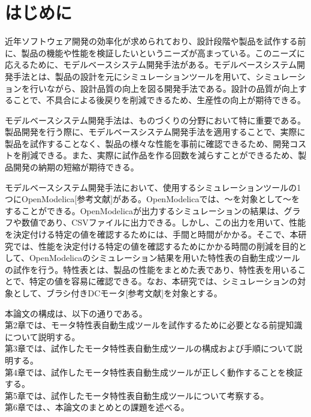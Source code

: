 \chapter{はじめに}\label{cha:Introduction}
近年ソフトウェア開発の効率化が求められており、設計段階や製品を試作する前に、製品の機能や性能を検証したいというニーズが高まっている\cite{modelica_beginners_book}。このニーズに応えるために、モデルベースシステム開発手法がある\cite{modelica_beginners_book}。モデルベースシステム開発手法とは、製品の設計を元にシミュレーションツールを用いて、シミュレーションを行いながら、設計品質の向上を図る開発手法である\cite{ipa_2016}。設計の品質が向上することで、不具合による後戻りを削減できるため、生産性の向上が期待できる\cite{ipa_2016}。

モデルベースシステム開発手法は、ものづくりの分野において特に重要である\cite{ipa_useful_modelbase_dev}。製品開発を行う際に、モデルベースシステム開発手法を適用することで、実際に製品を試作することなく、製品の様々な性能を事前に確認できるため、開発コストを削減できる\cite{modelica_beginners_book}。また、実際に試作品を作る回数を減らすことができるため、製品開発の納期の短縮が期待できる。

モデルベースシステム開発手法において、使用するシミュレーションツールの1つにOpenModelica[参考文献]がある。OpenModelicaでは、～を対象として～をすることができる。OpenModelicaが出力するシミュレーションの結果は、グラフや数値であり、CSVファイルに出力できる。しかし、この出力を用いて、性能を決定付ける特定の値を確認するためには、手間と時間がかかる。そこで、本研究では、性能を決定付ける特定の値を確認するためにかかる時間の削減を目的として、OpenModelicaのシミュレーション結果を用いた特性表の自動生成ツールの試作を行う。特性表とは、製品の性能をまとめた表であり、特性表を用いることで、特定の値を容易に確認できる。なお、本研究では、シミュレーションの対象として、ブラシ付きDCモータ[参考文献]を対象とする。



本論文の構成は、以下の通りである。\\
第2章では、モータ特性表自動生成ツールを試作するために必要となる前提知識について説明する。\\
第3章では、試作したモータ特性表自動生成ツールの構成および手順について説明する。\\
第4章では、試作したモータ特性表自動生成ツールが正しく動作することを検証する。\\
第5章では、試作したモータ特性表自動生成ツールについて考察する。\\
第6章では、、本論文のまとめとの課題を述べる。\\